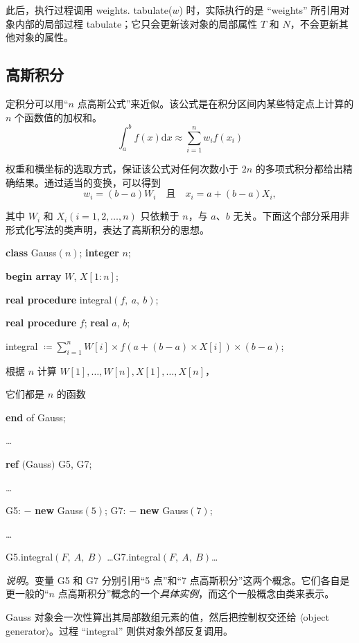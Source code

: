 此后，执行过程调用 weights. tabulate($w$) 时，实际执行的是 ``weights'' 所引用对象内部的局部过程 tabulate；它只会更新该对象的局部属性 $T$ 和 $N$，不会更新其他对象的属性。

\subsection{高斯积分}

定积分可以用“$n$ 点高斯公式”来近似。该公式是在积分区间内某些特定点上计算的 $n$ 个函数值的加权和。
$$
\int_a^b f(x)\text{d}x \approx \sum_{i = 1}^n w_i f(x_i)
$$

\noindent
权重和横坐标的选取方式，保证该公式对任何次数小于 $2n$ 的多项式积分都给出精确结果。通过适当的变换，可以得到
$$
w_i = (b - a)W_i \quad\text{且}\quad x_i = a + (b - a)X_i,
$$

\noindent
其中 $W_i$ 和 $X_i(i = 1, 2, \dots, n)$ 只依赖于 $n$，与 $a$、$b$ 无关。下面这个部分采用非形式化写法的类声明，表达了高斯积分的思想。

\quad \textbf{class} Gauss$(n)$; \textbf{integer} $n$;

\quad \textbf{begin array} $W$, $X[1:n]$;

\quad \quad \textbf{real procedure} integral$(f,\ a,\ b)$;

\quad \quad \textbf{real procedure} $f$; \textbf{real} $a$, $b$;

\quad \quad integral $\coloneq \sum_{i=1}^n W[i] \times f(a + (b - a)\times X[i])\times (b- a)$;

\quad \quad 根据 $n$ 计算 $W[1], \dots, W[n], X[1], \dots, X[n]$，

\quad \quad 它们都是 $n$ 的函数

\quad \textbf{end} of Gauss;

\quad \dots

\quad \textbf{ref} $($Gauss$)$ G5, G7;

\quad \dots

\quad G5: $-$ \textbf{new} Gauss$(5)$; G7: $-$ \textbf{new} Gauss$(7)$;

\quad \dots

\quad G5.integral$(F,\ A,\ B)$ \dots G7.integral$(F,\ A,\ B)$\dots

\noindent
\textit{说明}。变量 G5 和 G7 分别引用“5 点”和“7 点高斯积分”这两个概念。它们各自是
更一般的“$n$ 点高斯积分”概念的一个\textit{具体实例}，而这个一般概念由类来表示。

Gauss 对象会一次性算出其局部数组元素的值，然后把控制权交还给 $\langle$object generator$\rangle$。过程 ``integral'' 则供对象外部反复调用。

